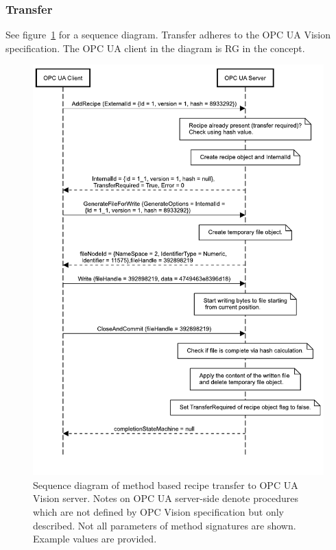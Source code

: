 \subsubsection{Transfer}
See figure~\ref{fig:runtimeviewgen} for a sequence diagram. Transfer adheres to the OPC UA Vision specification. The OPC UA client in the diagram is RG in the concept.
\begin{figure}
    \centering
    \includegraphics[height=0.9\textheight]{img/OPCUAVisionAddRecipe.pdf}
    \caption[Sequence diagram of method based recipe transfer]{Sequence diagram of method based recipe transfer to OPC UA Vision server. Notes on OPC UA server-side denote procedures which are not defined by OPC Vision specification but only described. Not all parameters of method signatures are shown. Example values are provided.}
    \label{fig:runtimeviewgen}
\end{figure}
